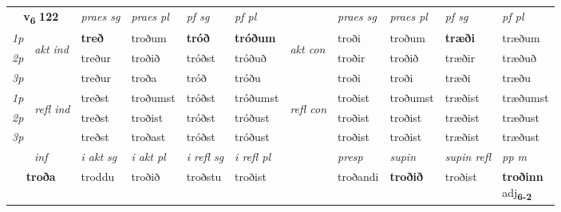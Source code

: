 \noindent
\begin{tabular}{lllllllllll} \toprule
\multicolumn{2}{c}{\textbf{v{\textsubscript{6}}} \Large{\textbf{122}}}  &  \textit{praes sg}  & \textit{praes pl}  &\textit{ pf sg} & \textit{pf pl} &  &  \textit{praes sg}  & \textit{praes pl}  & \textit{pf sg} & \textit{pf pl } \\*
	\cmidrule{3-6} \cmidrule{8-11}
 {\textit{1p}} & \multirow{3}{*}{\begin{turn}{90}\textit{akt ind}\end{turn}} & \textbf{treð} & troðum & \textbf{tróð} & \textbf{tróðum} & \multirow{3}{*}{\begin{turn}{90}\textit{akt con}\end{turn}} &troði & troðum & \textbf{træði} & træðum\\*
 {\textit{2p}} &  &  treður  & troðið & tróðst & tróðuð & & troðir & troðið & træðir & træðuð \\*
{\textit{3p}} &  & treður & troða & tróð & tróðu & & troði & troði& træði & træðu \\*
\cmidrule{3-6} \cmidrule{8-11}
 {\textit{1p}} & \multirow{3}{*}{\begin{turn}{90}\textit{refl ind}\end{turn}}  & treðst & troðumst & tróðst & tróðumst & \multirow{3}{*}{\begin{turn}{90}\textit{refl con}\end{turn}}  &troðist & troðumst & træðist & træðumst \\*
 {\textit{2p}} &  & treðst & troðist & tróðst & tróðust & &troðist & troðist & træðist & træðust \\*
 {\textit{3p}}  & & treðst & troðast & tróðst & tróðust & & troðist & troðist& træðist & træðust \\*
\cmidrule{3-6} \cmidrule{8-11}

   \multicolumn{2}{c}{\textit{inf}}  & \textit{i akt sg} & \textit{i akt pl} & \textit{i refl sg} & \textit{i refl pl} && \textit{presp} & \textit{supin} & \textit{supin refl} & \textit{pp m} \\*
  \multicolumn{2}{c}{\textbf{troða}} & troddu  & troðið & troðstu & troðist && troðandi &  \textbf{troðið} & troðist & \specialcell{\textbf{troðinn} \\ adj\textbf{\textsubscript{6-2}}} \\*
\end{tabular}

